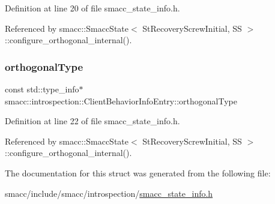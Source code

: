 Definition at line 20 of file smacc\+\_\+state\+\_\+info.\+h.



Referenced by smacc\+::\+Smacc\+State$<$ St\+Recovery\+Screw\+Initial, S\+S $>$\+::configure\+\_\+orthogonal\+\_\+internal().

\mbox{\label{structsmacc_1_1introspection_1_1ClientBehaviorInfoEntry_aabffb57e6ee723ce1b2bdb6ad30c6993}} 
\subsubsection{\texorpdfstring{orthogonal\+Type}{orthogonalType}}
{\footnotesize\ttfamily const std\+::type\+\_\+info$\ast$ smacc\+::introspection\+::\+Client\+Behavior\+Info\+Entry\+::orthogonal\+Type}



Definition at line 22 of file smacc\+\_\+state\+\_\+info.\+h.



Referenced by smacc\+::\+Smacc\+State$<$ St\+Recovery\+Screw\+Initial, S\+S $>$\+::configure\+\_\+orthogonal\+\_\+internal().



The documentation for this struct was generated from the following file\+:\begin{DoxyCompactItemize}
\item 
smacc/include/smacc/introspection/\hyperlink{smacc__state__info_8h}{smacc\+\_\+state\+\_\+info.\+h}\end{DoxyCompactItemize}
